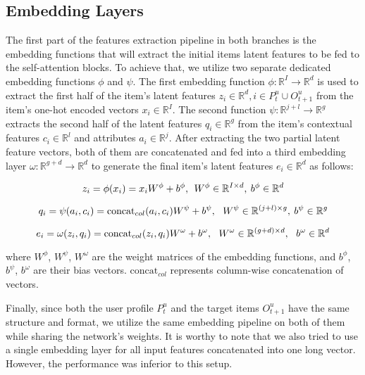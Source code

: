 \documentclass[sigconf,natbib=true]{acmart}
\begin{document}
\subsection{Embedding Layers}
The first part of the features extraction pipeline in both branches is the embedding functions that will extract the initial items latent features to be fed to the self-attention blocks. To achieve that, we utilize two separate dedicated embedding functions $\phi$ and $\psi$. The first embedding function $\phi: \mathbb{R}^{I} \rightarrow \mathbb{R}^{d}$ is used to extract the first half of the item's latent features $z_{i} \in \mathbb{R}^{d}, i \in P^{u}_{t} \cup O^{u}_{t+1} $ from the item's one-hot encoded vectors $x_{i} \in \mathbb{R}^{I}$. The second function $\psi: \mathbb{R}^{j+l} \rightarrow \mathbb{R}^{g}$ extracts the second half of the latent features $q_{i} \in \mathbb{R}^{g}$ from the item's contextual features $c_{i} \in \mathbb{R}^{l}$ and attributes $a_{i} \in \mathbb{R}^{j}$. After extracting the two partial latent feature vectors, both of them are concatenated and fed into a third embedding layer $\omega: \mathbb{R}^{g+d} \rightarrow \mathbb{R}^{d}$ to generate the final item's latent features $e_i \in \mathbb{R}^{d}$ as follows:


\begin{equation} 
z_{i}=\phi(x_{i})= x_{i}W^{\phi} + b^{\phi}, \: \: W^{\phi} \in {\mathbb R}^{I\times d}, \:  b^{\phi} \in {\mathbb R}^{d} 
\end{equation} 

\begin{equation}
q_{i}= \psi(a_{i},c_{i}) =  \text{concat}_{col}(a_{i},c_{i})W^{\psi} + b^{\psi}, \: \: \: W^{\psi} \in {\mathbb R}^{ (j+l)\times g}, \: b^{\psi} \in {\mathbb R}^{g} 
\end{equation} 

\begin{equation} 
 e_{i}= \omega(z_{i},q_{i}) = \text{concat}_{col}(z_{i},q_{i})W^{\omega} + b^{\omega},\: \: \: W^{\omega} \in {\mathbb R}^{ (g+d)\times d},\: \: \: b^{\omega} \in {\mathbb R}^{d} 
\end{equation} 



\noindent where $W^{\phi}$, $W^{\psi}$, $W^{\omega}$ are the weight matrices of the embedding functions, and $b^{\phi}$, $b^{\psi}$, $b^{\omega}$ are their bias vectors. $\text{concat}_{col}$ represents column-wise concatenation of vectors.

Finally, since both the user profile $P^{u}_{t}$ and the target items $O^{u}_{t+1}$ have the same structure and format, we utilize the same embedding pipeline on both of them while sharing the network's weights. It is worthy to note that we also tried to use a single embedding layer for all input features concatenated into one long vector. However, the performance was inferior to this setup. 
\end{document}
